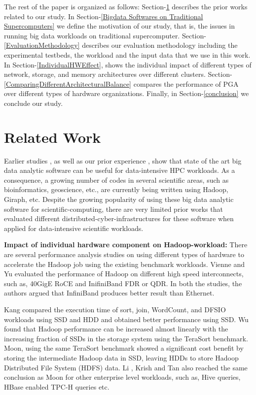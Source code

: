 \documentclass[10pt, conference, compsocconf]{IEEEtran}
\begin{document}
The rest of the paper is organized as follows:
Section-\ref{Related Work} describes the prior works related to our study. 
In Section-\ref{Bigdata Softwares on Traditional Supercomputers} we define the motivation of our study, that is, the issues in running big data workloads on traditional supercomputer. Section-\ref{EvaluationMethodology} describes our evaluation methodology including the experimental testbeds, the workload and the input data that we use in this work. In Section-\ref{IndividualHWEffect}, shows the individual impact of different types of network, storage, and memory architectures over different clusters. Section-\ref{ComparingDifferentArchitecturalBalance} compares the performance of PGA over different types of hardware organizations. Finally, in Section-\ref{conclusion} we conclude our study.

\section {Related Work} \label{Related Work}
Earlier studies \cite{schadoop:fadika} \cite{schadoop:jha}, as well as our prior experience \cite{DBLP:conf/icpads/SatishKPPS14}, \cite{kondikoppa2012network} show that state of the art big data analytic software can be useful for data-intensive HPC workloads. As a consequence, a growing number of codes in several scientific areas, such as bioinformatics, geoscience, etc., are currently being written using Hadoop, Giraph, etc. Despite the growing popularity of using these big data analytic software for scientific-computing, there are very limited prior works that evaluated different distributed-cyber-infrastructures for these software when applied for data-intensive scientific workloads.

\textbf{Impact of individual hardware component on Hadoop-workload:}
There are several performance analysis studies on using different types of hardware to accelerate the Hadoop job using the existing benchmark workloads. Vienne \cite{ethib:vienne} and Yu \cite{ethib:yu} evaluated the performance of Hadoop on different high speed interconnects, such as, 40GigE RoCE and InifiniBand FDR or QDR. In both the studies, the authors argued that InfiniBand produces better result than Ethernet.

Kang \cite{ssdhdd:kang} compared the execution time of sort, join, WordCount, and DFSIO workloads using SSD and HDD and obtained better performance using SSD. Wu \cite{ssdhdd:wu} found that Hadoop performance can be increased almost linearly with the increasing fraction of SSDs in the storage system using the TeraSort benchmark. Moon, using the same TeraSort benchmark \cite{ssdhdd:moon} showed a significant cost benefit by storing the intermediate Hadoop data in SSD, leaving HDDs to store Hadoop Distributed File System (HDFS) data. Li \cite{ssdhdd:li}, Krish \cite{ssdhdd:krish} and Tan \cite{ssdhdd:tan} also reached the same conclusion as Moon \cite{ssdhdd:moon} for other enterprise level workloads, such as, Hive queries, HBase enabled TPC-H queries etc. 
\end{document}
